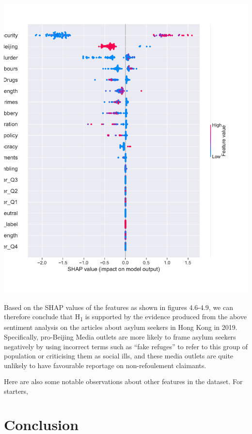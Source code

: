 \documentclass[a4paper, oneside]{report}
\begin{document}
\includegraphics{versions/Chin_Chapter_4_2022-01-10_files/figure-latex/unnamed-chunk-16-7.pdf}

Based on the SHAP values of the features as shown in figures 4.6-4.9, we
can therefore conclude that H\textsubscript{1} is supported by the
evidence produced from the above sentiment analysis on the articles
about asylum seekers in Hong Kong in 2019. Specifically, pro-Beijing
Media outlets are more likely to frame asylum seekers negatively by
using incorrect terms such as ``fake refuges'' to refer to this group of
population or criticising them as social ills, and these media outlets
are quite unlikely to have favourable reportage on non-refoulement
claimants.

Here are also some notable observations about other features in the
dataset. For starters,

\setcounter{chapter}{4}

\hypertarget{conclusion}{%
\chapter{Conclusion}\label{conclusion}}
\end{document}
